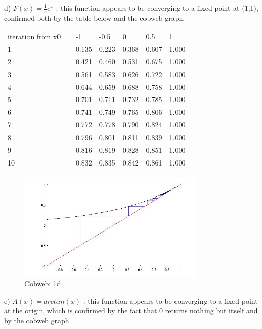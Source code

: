 \documentclass[12pt]{article}
\newenvironment{myenv}{\begin{adjustwidth}{1cm}{}}{\end{adjustwidth}}
\begin{document}
\begin{myenv}
d) $F(x) = \frac{1}{e}e^x$ : this function appears to be converging to a fixed point at (1,1), confirmed both by the table below and the cobweb graph.

\begin{table}[h]
\begin{tabular}{llllll}
iteration from x0 = & -1    & -0.5  & 0     & 0.5   & 1     \\
1                   & 0.135 & 0.223 & 0.368 & 0.607 & 1.000 \\
2                   & 0.421 & 0.460 & 0.531 & 0.675 & 1.000 \\
3                   & 0.561 & 0.583 & 0.626 & 0.722 & 1.000 \\
4                   & 0.644 & 0.659 & 0.688 & 0.758 & 1.000 \\
5                   & 0.701 & 0.711 & 0.732 & 0.785 & 1.000 \\
6                   & 0.741 & 0.749 & 0.765 & 0.806 & 1.000 \\
7                   & 0.772 & 0.778 & 0.790 & 0.824 & 1.000 \\
8                   & 0.796 & 0.801 & 0.811 & 0.839 & 1.000 \\
9                   & 0.816 & 0.819 & 0.828 & 0.851 & 1.000 \\
10                  & 0.832 & 0.835 & 0.842 & 0.861 & 1.000
\end{tabular}
\end{table}

\begin{figure} [H]
    \centering
    \includegraphics[width=0.8\textwidth]{cobweb1d}
    \caption{Cobweb: 1d}
    \label{figure:a3}
\end{figure}

e) $A(x) = arctan(x)$ : this function appears to be converging to a fixed point at the origin, which is confirmed by the fact that 0 returns nothing but itself and by the cobweb graph.


\end{myenv}
\end{document}
